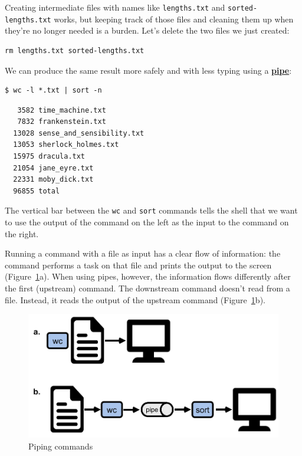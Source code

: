 \documentclass[
]{krantz}
\newcommand{\gref}[2]{\hyperlink{#2}{\textbf{#1}}}
\begin{document}
Creating intermediate files with names like \texttt{lengths.txt} and \texttt{sorted-lengths.txt} works,
but keeping track of those files and cleaning them up when they're no longer needed is a burden.
Let's delete the two files we just created:

\begin{verbatim}
rm lengths.txt sorted-lengths.txt
\end{verbatim}

We can produce the same result more safely and with less typing
using a \gref{pipe}{pipe\_shell}:

\begin{verbatim}
$ wc -l *.txt | sort -n
\end{verbatim}

\begin{verbatim}
   3582 time_machine.txt
   7832 frankenstein.txt
  13028 sense_and_sensibility.txt
  13053 sherlock_holmes.txt
  15975 dracula.txt
  21054 jane_eyre.txt
  22331 moby_dick.txt
  96855 total
\end{verbatim}

The vertical bar \texttt{\textbar{}} between the \texttt{wc} and \texttt{sort} commands
tells the shell that we want to use the output of the command on the left
as the input to the command on the right.

Running a command with a file as input has a clear flow of information:
the command performs a task on that file and prints the output to the screen
(Figure~\ref{fig:bash-tools-pipe}a).
When using pipes, however,
the information flows differently after the first (upstream) command.
The downstream command doesn't read from a file.
Instead,
it reads the output of the upstream command
(Figure~\ref{fig:bash-tools-pipe}b).

\begin{figure}

{\centering \includegraphics[width=0.8\linewidth]{figures/bash-tools/pipe} 

}

\caption{Piping commands}\label{fig:bash-tools-pipe}
\end{figure}
\end{document}

